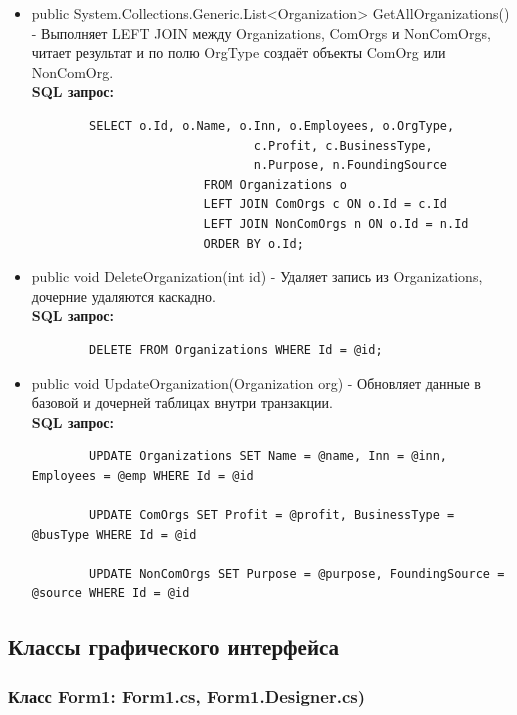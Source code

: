 \documentclass[oneside,a4paper,14pt]{extarticle}
\begin{document}
\begin{itemize}
\begin{lstlisting}
    INSERT INTO NonComOrgs (Id, Purpose, FoundingSource) VALUES (@id, @purpose, @source)
    \end{lstlisting}
    \item public System.Collections.Generic.List<Organization> GetAllOrganizations() - Выполняет LEFT JOIN между Organizations, ComOrgs и NonComOrgs, читает результат и по полю OrgType создаёт объекты ComOrg или NonComOrg.\\
    \textbf{SQL запрос:}
    \begin{lstlisting}
        SELECT o.Id, o.Name, o.Inn, o.Employees, o.OrgType,
                               c.Profit, c.BusinessType,
                               n.Purpose, n.FoundingSource
                        FROM Organizations o
                        LEFT JOIN ComOrgs c ON o.Id = c.Id
                        LEFT JOIN NonComOrgs n ON o.Id = n.Id
                        ORDER BY o.Id;
    \end{lstlisting}
    \item public void DeleteOrganization(int id) - Удаляет запись из Organizations, дочерние удаляются каскадно.
    \\
    \textbf{SQL запрос:}
    \begin{lstlisting}
        DELETE FROM Organizations WHERE Id = @id;
    \end{lstlisting}
    \item public void UpdateOrganization(Organization org) - Обновляет данные в базовой и дочерней таблицах внутри транзакции.\\
    \textbf{SQL запрос:}
    \begin{lstlisting}
        UPDATE Organizations SET Name = @name, Inn = @inn, Employees = @emp WHERE Id = @id

        UPDATE ComOrgs SET Profit = @profit, BusinessType = @busType WHERE Id = @id

        UPDATE NonComOrgs SET Purpose = @purpose, FoundingSource = @source WHERE Id = @id
    \end{lstlisting}
\end{itemize}

\newpage

\subsection*{Классы графического интерфейса}

\subsubsection*{Класс Form1: Form1.cs, Form1.Designer.cs)}
\end{document}

